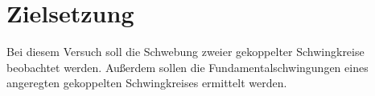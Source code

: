 \section{Zielsetzung}
\label{sec:Zielsetzung}

Bei diesem Versuch soll die Schwebung zweier gekoppelter Schwingkreise beobachtet werden. Außerdem sollen
die Fundamentalschwingungen eines angeregten gekoppelten Schwingkreises ermittelt werden.
